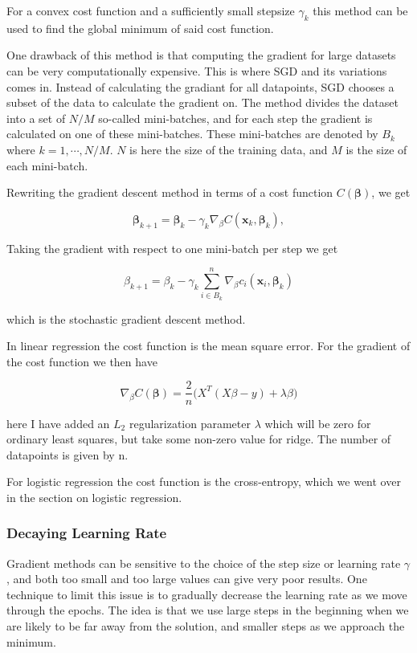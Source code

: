 \documentclass[11pt]{article}
\begin{document}
For a convex cost function and a sufficiently small stepsize
\(\gamma_k\) this method can be used to find the global minimum of said
cost function.

One drawback of this method is that computing the gradient for large
datasets can be very computationally expensive. This is where SGD and
its variations comes in. Instead of calculating the gradiant for all
datapoints, SGD chooses a subset of the data to calculate the gradient
on. The method divides the dataset into a set of \(N/M\) so-called
mini-batches, and for each step the gradient is calculated on one of
these mini-batches. These mini-batches are denoted by \(B_k\) where
\(k=1,\cdots,N/M\). \(N\) is here the size of the training data, and
\(M\) is the size of each mini-batch.

Rewriting the gradient descent method in terms of a cost function
\(C(\mathbf{\beta})\), we get

\[
\mathbf{\beta}_{k+1} = \mathbf{\beta}_k - \gamma_k \nabla_{\beta} C(\mathbf{x}_k,\mathbf{\beta}_k),
\]

Taking the gradient with respect to one mini-batch per step we get

\[
\beta_{k+1} = \beta_k - \gamma_k \sum_{i \in B_k}^n \nabla_\beta c_i(\mathbf{x}_i,
\mathbf{\beta}_k)
\]

which is the stochastic gradient descent method.

In linear regression the cost function is the mean square error. For the
gradient of the cost function we then have

\[
\nabla_{\beta} C(\mathbf{\beta}) = \frac{2}{n} \bigg( X^T (X\beta-y) + \lambda \beta \bigg)
\]

here I have added an \(L_2\) regularization parameter \(\lambda\) which
will be zero for ordinary least squares, but take some non-zero value
for ridge. The number of datapoints is given by n.~

For logistic regression the cost function is the cross-entropy, which we
went over in the section on logistic regression.

\hypertarget{decaying-learning-rate}{%
\subsubsection{Decaying Learning Rate}\label{decaying-learning-rate}}

Gradient methods can be sensitive to the choice of the step size or
learning rate \(\gamma\), and both too small and too large values can
give very poor results. One technique to limit this issue is to
gradually decrease the learning rate as we move through the epochs. The
idea is that we use large steps in the beginning when we are likely to
be far away from the solution, and smaller steps as we approach the
minimum.
\end{document}
